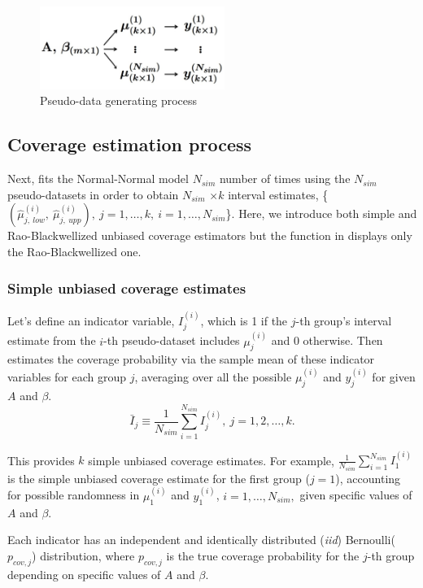 \documentclass[article]{jss}
\begin{document}
\begin{figure}[h]
\begin{center}
\includegraphics[width=6cm]{process.png}
\caption{Pseudo-data generating process}
\label{fig:pseudo}
\end{center}
\end{figure}

\subsection{Coverage estimation process}
Next,  fits the Normal-Normal model  $N_{sim}$ number of times using the $N_{sim}$ pseudo-datasets in order to obtain $N_{sim}$ $\times k$ interval estimates,  \{$(\hat{\mu}^{(i)}_{j, ~low}, ~\hat{\mu}^{(i)}_{j, ~upp}), ~j=1,\ldots, k,~ i=1, \ldots, N_{sim}$\}.  Here, we introduce both simple and Rao-Blackwellized unbiased coverage estimators but the function  in  displays only the Rao-Blackwellized one.

\subsubsection{Simple unbiased coverage estimates}
Let's define an indicator variable, $I^{(i)}_{j}$, which is 1 if the $j$-th group's interval estimate from the $i$-th pseudo-dataset includes $\mu^{(i)}_{j}$ and 0 otherwise. Then  estimates the coverage probability via the sample mean of these indicator variables for each group $j$, averaging over all the possible $\mu^{(i)}_{j}$ and $y^{(i)}_{j}$ for given $A$ and $\beta$. 
\begin{equation}
\bar{I}_{j}\equiv \frac{1}{N_{sim}}\sum_{i=1}^{N_{sim}}I^{(i)}_{j},~ j=1, 2, \ldots, k.
\end{equation}

This provides $k$ simple unbiased coverage estimates. For example, $\frac{1}{N_{sim}}\sum_{i=1}^{N_{sim}}I^{(i)}_{1}$ is the simple unbiased coverage estimate for the first group ($j=1$), accounting for possible randomness in $\mu^{(i)}_{1}$ and $y^{(i)}_{1}$, $i=1, \ldots, N_{sim},$ given specific values of $A$ and $\beta$. 

Each indicator has an independent and identically distributed (\emph{iid}) Bernoulli($p_{cov, j}$) distribution, where $p_{cov, j}$ is the true coverage probability for the $j$-th group depending on specific values of $A$ and $\beta$. 
\end{document}
